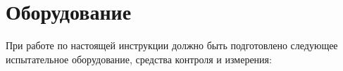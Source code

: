 \section{Оборудование}
  \point При работе по настоящей инструкции должно быть подготовлено следующее испытательное оборудование, средства контроля и измерения:

  
  \newcommand{\ltheadEquipment}{}
  \renewcommand{\ltheadEquipment}
    {
    \hline    
    \multicolumn{1}{m{4,5cm}|}{\centering Тип оборудования, наименование}&
    \multicolumn{1}{m{1,1cm}|}{\centering Кол.}&
    \multicolumn{1}{m{4,5cm}|}{\centering Обозначение}&
    \multicolumn{1}{m{6,3cm} }{\centering Требуемая метрологическая характеристика}\\\hline
    }  
    

